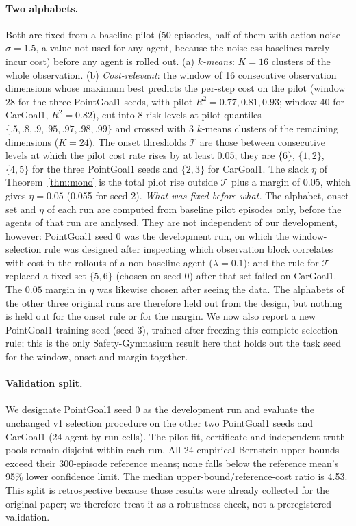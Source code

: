 \documentclass{article}
\begin{document}
\paragraph{Two alphabets.} Both are fixed from a baseline pilot (50 episodes, half of them with action noise $\sigma=1.5$, a value not used for any agent, because the noiseless baselines rarely incur cost) before any agent is rolled out. (a) \emph{$k$-means}: $K=16$ clusters of the whole observation. (b) \emph{Cost-relevant}: the window of 16 consecutive observation dimensions whose maximum best predicts the per-step cost on the pilot (window 28 for the three PointGoal1 seeds, with pilot $R^2=0.77,0.81,0.93$; window 40 for CarGoal1, $R^2=0.82$), cut into 8 risk levels at pilot quantiles $\{.5,.8,.9,.95,.97,.98,.99\}$ and crossed with 3 $k$-means clusters of the remaining dimensions ($K=24$). The onset thresholds $\mathcal T$ are those between consecutive levels at which the pilot cost rate rises by at least 0.05; they are $\{6\}$, $\{1,2\}$, $\{4,5\}$ for the three PointGoal1 seeds and $\{2,3\}$ for CarGoal1. The slack $\eta$ of Theorem~\ref{thm:mono} is the total pilot rise outside $\mathcal T$ plus a margin of $0.05$, which gives $\eta=0.05$ (0.055 for seed 2). \emph{What was fixed before what.} The alphabet, onset set and $\eta$ of each run are computed from baseline pilot episodes only, before the agents of that run are analysed. They are not independent of our development, however: PointGoal1 seed 0 was the development run, on which the window-selection rule was designed after inspecting which observation block correlates with cost in the rollouts of a non-baseline agent ($\lambda=0.1$); and the rule for $\mathcal T$ replaced a fixed set $\{5,6\}$ (chosen on seed 0) after that set failed on CarGoal1. The $0.05$ margin in $\eta$ was likewise chosen after seeing the data. The alphabets of the other three original runs are therefore held out from the design, but nothing is held out for the onset rule or for the margin. We now also report a new PointGoal1 training seed (seed 3), trained after freezing this complete selection rule; this is the only Safety-Gymnasium result here that holds out the task seed for the window, onset and margin together.

\paragraph{Validation split.} We designate PointGoal1 seed 0 as the development run and evaluate the unchanged v1 selection procedure on the other two PointGoal1 seeds and CarGoal1 (24 agent-by-run cells). The pilot-fit, certificate and independent truth pools remain disjoint within each run. All 24 empirical-Bernstein upper bounds exceed their 300-episode reference means; none falls below the reference mean's 95\% lower confidence limit. The median upper-bound/reference-cost ratio is 4.53. This split is retrospective because those results were already collected for the original paper; we therefore treat it as a robustness check, not a preregistered validation.
\end{document}
